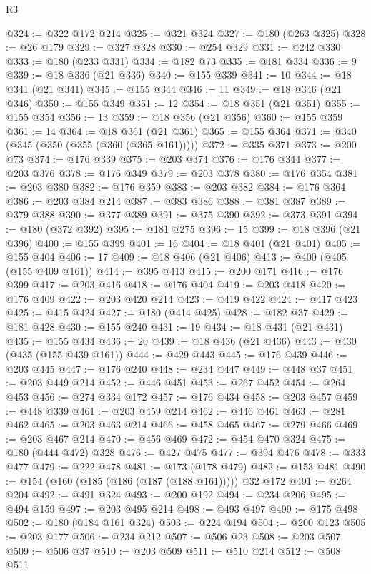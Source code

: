 \begin{lexlean}{R3}
\begin{coremodule}
@324 := @322 @172 @214
@325 := @321 @324
@327 := @180 (@263 @325)
@328 := @26 @179
@329 := @327 @328
@330 := @254 @329
@331 := @242 @330
@333 := @180 (@233 @331)
@334 := @182 @73
@335 := @181 @334
@336 := 9
@339 := @18 @336 (@21 @336)
@340 := @155 @339
@341 := 10
@344 := @18 @341 (@21 @341)
@345 := @155 @344
@346 := 11
@349 := @18 @346 (@21 @346)
@350 := @155 @349
@351 := 12
@354 := @18 @351 (@21 @351)
@355 := @155 @354
@356 := 13
@359 := @18 @356 (@21 @356)
@360 := @155 @359
@361 := 14
@364 := @18 @361 (@21 @361)
@365 := @155 @364
@371 := @340 (@345 (@350 (@355 (@360 (@365 @161)))))
@372 := @335 @371
@373 := @200 @73
@374 := @176 @339
@375 := @203 @374
@376 := @176 @344
@377 := @203 @376
@378 := @176 @349
@379 := @203 @378
@380 := @176 @354
@381 := @203 @380
@382 := @176 @359
@383 := @203 @382
@384 := @176 @364
@386 := @203 @384 @214
@387 := @383 @386
@388 := @381 @387
@389 := @379 @388
@390 := @377 @389
@391 := @375 @390
@392 := @373 @391
@394 := @180 (@372 @392)
@395 := @181 @275
@396 := 15
@399 := @18 @396 (@21 @396)
@400 := @155 @399
@401 := 16
@404 := @18 @401 (@21 @401)
@405 := @155 @404
@406 := 17
@409 := @18 @406 (@21 @406)
@413 := @400 (@405 (@155 @409 @161))
@414 := @395 @413
@415 := @200 @171
@416 := @176 @399
@417 := @203 @416
@418 := @176 @404
@419 := @203 @418
@420 := @176 @409
@422 := @203 @420 @214
@423 := @419 @422
@424 := @417 @423
@425 := @415 @424
@427 := @180 (@414 @425)
@428 := @182 @37
@429 := @181 @428
@430 := @155 @240
@431 := 19
@434 := @18 @431 (@21 @431)
@435 := @155 @434
@436 := 20
@439 := @18 @436 (@21 @436)
@443 := @430 (@435 (@155 @439 @161))
@444 := @429 @443
@445 := @176 @439
@446 := @203 @445
@447 := @176 @240
@448 := @234 @447
@449 := @448 @37
@451 := @203 @449 @214
@452 := @446 @451
@453 := @267 @452
@454 := @264 @453
@456 := @274 @334 @172
@457 := @176 @434
@458 := @203 @457
@459 := @448 @339
@461 := @203 @459 @214
@462 := @446 @461
@463 := @281 @462
@465 := @203 @463 @214
@466 := @458 @465
@467 := @279 @466
@469 := @203 @467 @214
@470 := @456 @469
@472 := @454 @470 @324
@475 := @180 (@444 @472) @328
@476 := @427 @475
@477 := @394 @476
@478 := @333 @477
@479 := @222 @478
@481 := @173 (@178 @479)
@482 := @153 @481
@490 := @154 (@160 (@185 (@186 (@187 (@188 @161))))) @32 @172
@491 := @264 @204
@492 := @491 @324
@493 := @200 @192
@494 := @234 @206
@495 := @494 @159
@497 := @203 @495 @214
@498 := @493 @497
@499 := @175 @498
@502 := @180 (@184 @161 @324)
@503 := @224 @194
@504 := @200 @123
@505 := @203 @177
@506 := @234 @212
@507 := @506 @23
@508 := @203 @507
@509 := @506 @37
@510 := @203 @509
@511 := @510 @214
@512 := @508 @511

\end{coremodule}
\end{lexlean}
